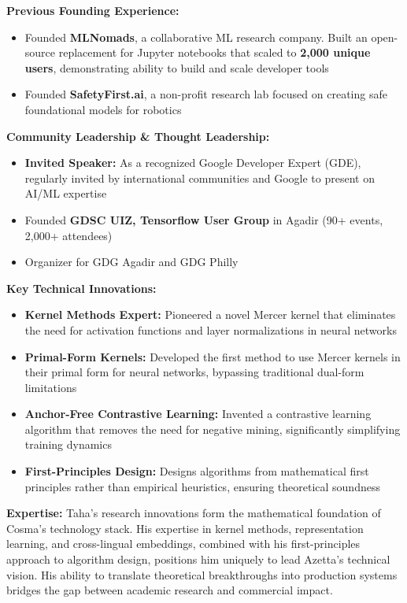 \textbf{Previous Founding Experience:}
\begin{itemize}[noitemsep]
    \item Founded \textbf{MLNomads}, a collaborative ML research company. Built an open-source replacement for Jupyter notebooks that scaled to \textbf{2,000 unique users}, demonstrating ability to build and scale developer tools
    \item Founded \textbf{SafetyFirst.ai}, a non-profit research lab focused on creating safe foundational models for robotics
\end{itemize}

\textbf{Community Leadership \& Thought Leadership:}
\begin{itemize}[noitemsep]
    \item \textbf{Invited Speaker:} As a recognized Google Developer Expert (GDE), regularly invited by international communities and Google to present on AI/ML expertise
    \item Founded \textbf{GDSC UIZ, Tensorflow User Group} in Agadir (90+ events, 2,000+ attendees)
    \item Organizer for GDG Agadir and GDG Philly
\end{itemize}

\textbf{Key Technical Innovations:}
\begin{itemize}[noitemsep]
    \item \textbf{Kernel Methods Expert:} Pioneered a novel Mercer kernel that eliminates the need for activation functions and layer normalizations in neural networks
    \item \textbf{Primal-Form Kernels:} Developed the first method to use Mercer kernels in their primal form for neural networks, bypassing traditional dual-form limitations
    \item \textbf{Anchor-Free Contrastive Learning:} Invented a contrastive learning algorithm that removes the need for negative mining, significantly simplifying training dynamics
    \item \textbf{First-Principles Design:} Designs algorithms from mathematical first principles rather than empirical heuristics, ensuring theoretical soundness
\end{itemize}

\textbf{Expertise:} Taha's research innovations form the mathematical foundation of Cosma's technology stack. His expertise in kernel methods, representation learning, and cross-lingual embeddings, combined with his first-principles approach to algorithm design, positions him uniquely to lead Azetta's technical vision. His ability to translate theoretical breakthroughs into production systems bridges the gap between academic research and commercial impact.

